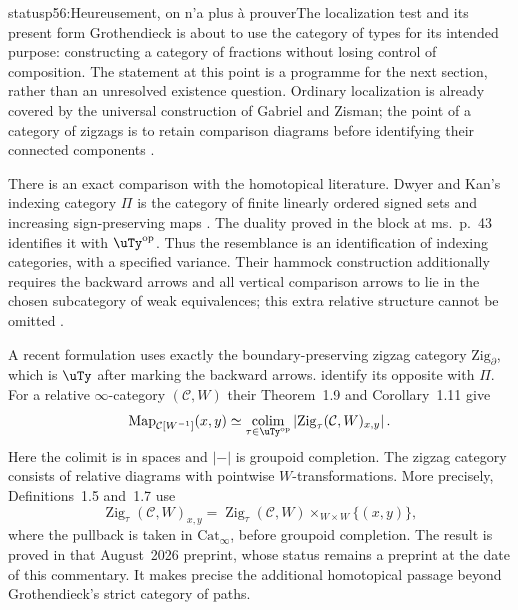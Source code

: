 \begin{dcomment}{status}{p56:Heureusement, on n'a plus à prouver}{The localization test and its present form}
Grothendieck is about to use the category of types for its intended purpose: constructing a category of fractions without losing control of composition. The statement at this point is a programme for the next section, rather than an unresolved existence question. Ordinary localization is already covered by the universal construction of Gabriel and Zisman; the point of a category of zigzags is to retain comparison diagrams before identifying their connected components \citep[I, \S1.1 and Lemma~1.2, pp.~6--7]{GabrielZisman1967}.

There is an exact comparison with the homotopical literature. Dwyer and Kan's indexing category $\Pi$ is the category of finite linearly ordered signed sets and increasing sign-preserving maps \citep[\S4.1]{DwyerKan1980Calculating}. The duality proved in the block at ms.~p.~43 identifies it with $\uTy^{\mathrm{op}}$. Thus the resemblance is an identification of indexing categories, with a specified variance. Their hammock construction additionally requires the backward arrows and all vertical comparison arrows to lie in the chosen subcategory of weak equivalences; this extra relative structure cannot be omitted \citep[\S\S2.1, 5.1]{DwyerKan1980Calculating}.

A recent formulation uses exactly the boundary-preserving zigzag category $\mathrm{Zig}_{\partial}$, which is $\uTy$ after marking the backward arrows. \citet[Definition~1.1 and Remark~1.3]{ArakawaCnossen2026} identify its opposite with $\Pi$. For a relative $\infty$-category $(\mathcal C,W)$ their Theorem~1.9 and Corollary~1.11 give
\[
 \operatorname{Map}_{\mathcal C[W^{-1}]}(x,y)
 \simeq
 \mathop{\operatorname{colim}}_{\tau\in\uTy^{\mathrm{op}}}
       \left|\operatorname{Zig}_{\tau}(\mathcal C,W)_{x,y}\right|.
\]
Here the colimit is in spaces and $|{-}|$ is groupoid completion. The zigzag category consists of relative diagrams with pointwise $W$-transformations. More precisely, Definitions~1.5 and~1.7 use
\[
 \operatorname{Zig}_{\tau}(\mathcal C,W)_{x,y}
 =\operatorname{Zig}_{\tau}(\mathcal C,W)
       \mathbin{\times}_{W\times W}\{(x,y)\},
\]
where the pullback is taken in $\mathrm{Cat}_{\infty}$, before groupoid completion. The result is proved in that August~2026 preprint, whose status remains a preprint at the date of this commentary. It makes precise the additional homotopical passage beyond Grothendieck's strict category of paths.


\end{dcomment}
